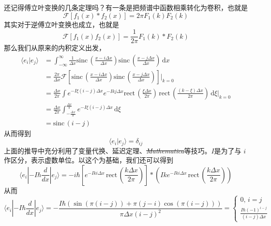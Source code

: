 \documentclass[12pt,a4paper,openany,twoside]{book}
\numberwithin{equation}{section}
\newcommand{\sinc}[1]{\mathrm{sinc} \, (#1)}
\begin{document}
        还记得傅立叶变换的几条定理吗？有一条是把频谱中函数相乘转化为卷积，也就是
        \begin{equation}
      	  \mathcal{F}[f_1(x) * f_2(x)] = 2\pi F_1(k) F_2(k) 
        \end{equation}
        其实对于逆傅立叶变换也成立，也就是
        \begin{equation}
      	  \mathcal{F}[f_1(x) f_2(x)] = \frac{1}{2\pi} F_1(k) * F_2(k) 
        \end{equation}
        那么我们从原来的内积定义出发，
        \begin{align*}
        	\langle e_i | e_j \rangle &= \int _{-\infty}^\infty \frac{1}{\Delta x} \sinc{\frac{x- i \Delta x}{\Delta x}} \sinc{\frac{x- j \Delta x}{\Delta x}} \, \mathrm{d}x\\ 
      				   &= \frac{2\pi}{\Delta x} \mathcal{F}[\sinc{\frac{x - i\Delta x}{\Delta x}} \sinc{\frac{x- j \Delta x}{\Delta x}}] \bigg|_{k=0} \\
      				   &= \frac{\Delta x}{2\pi} \int e^{- I \xi (i-j) \Delta x} e^{-I k j \Delta x}\mathrm{rect}\, \left( \frac{\xi \Delta x}{2 \pi} \right)  \, \mathrm{rect} \, \left( \frac{(k-\xi) \Delta x}{2 \pi} \right) \, \mathrm{d} \xi \bigg|_{k=0} \\
      				   &= \frac{\Delta x}{2 \pi} \int _{-\frac{\Delta x}{\pi}} ^{\frac{\Delta x}{\pi}} e^{-I \xi (i-j) \Delta x}  \, \mathrm{d} \xi \\
      				   &= \sinc{i-j} 
        \end{align*}
        从而得到
        \begin{equation}
        	\langle e_i | e_j \rangle = \delta_{ij}
        \end{equation}
        上面的推导中充分利用了变量代换、延迟定理、\sout{\emph{Mathematica}}等技巧。$I$是为了与 $i$作区分，表示虚数单位。以这个为基础，我们还可以得到
        \begin{equation*}
      	  \langle e_i | - I \hbar \frac{d}{dx} | e_j \rangle = -i\hbar \left[ e^{-I k i \Delta x} \,\mathrm{rect}\, \left( \frac{k \Delta x}{2 \pi} \right)  \right] * \left( I k e^{- I k i \Delta x} \, \mathrm{rect} \, \left( \frac{k \Delta x }{ 2 \pi} \right)  \right) 
        \end{equation*}
        从而
        \begin{equation}
      	  \langle e_i | - I \hbar \frac{d}{dx} | e_j \rangle = -\frac{I \hbar (\sin (\pi  (i-j))+\pi  (j-i) \cos (\pi  (i-j)))}{\pi \Delta
          x (i-j)^2} = 
          \begin{cases}
         	  0, \, i=j \\
      	    \frac{I\hbar (-1)^{i-j}}{(i-j) \Delta x}
          \end{cases}
        \end{equation}
\end{document}
